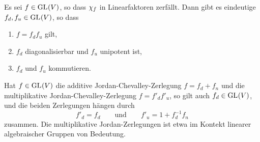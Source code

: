 \begin{theorem}
  Es sei $f \in \operatorname{GL}_{}(V)$, so dass $\chi_{f}$ in Linearfaktoren zerfällt.
  Dann gibt es eindeutige $f_d, f_u \in \operatorname{GL}_{}(V)$, so dass
  \begin{enumerate}
    \item
      $f = f_d f_u$ gilt,
    \item
      $f_d$ diagonalisierbar und $f_u$ unipotent ist,
    \item
      $f_d$ und $f_u$ kommutieren.
  \end{enumerate}
\end{theorem}

Hat $f \in \operatorname{GL}_{}(V)$ die additive Jordan-Chevalley-Zerlegung $f = f_d + f_n$ und die multiplikative Jordan-Chevalley-Zerlegung $f = f'_d f'_u$, so gilt auch $f_d \in \operatorname{GL}_{}(V)$, und die beiden Zerlegungen hängen durch
\[
  f'_d = f_d
  \qquad\text{und}\qquad
  f'_u = 1 + f_d^{-1} f_n
\]
zusammen.
Die multiplikative Jordan-Zerlegungen ist etwa im Kontekt linearer algebraischer Gruppen von Bedeutung.

